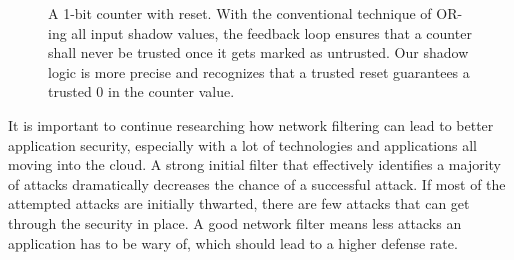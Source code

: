 \begin{figure}[t]
\begin{center}
\vspace{-0.2in}
\caption{A 1-bit counter with reset. With the conventional technique of OR-ing all input shadow values, the feedback loop ensures that a 
counter shall never be trusted once it gets marked as untrusted. Our shadow logic is more precise and recognizes that a trusted reset 
guarantees a trusted $0$ in the counter value.}
\label{fig:1bcounter}
\end{center}
\end{figure}



It is important to continue researching how network filtering can lead to better application security, especially with a lot of technologies and applications all moving into the cloud.
A strong initial filter that effectively identifies a majority of attacks dramatically decreases the chance of a successful attack. If most of the attempted attacks are initially thwarted,
there are few attacks that can get through the security in place. A good network filter means less attacks an application has to be wary of, which should lead to a higher defense rate.